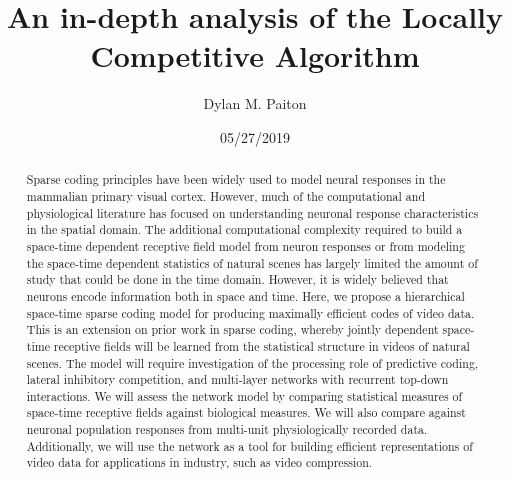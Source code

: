 \documentclass[smallextended]{svjour3}       %
\begin{document}
\title{An in-depth analysis of the Locally Competitive Algorithm
}



\author{Dylan M. Paiton}





\date{05/27/2019}

\maketitle

\begin{abstract}
Sparse coding principles have been widely used to model neural responses in the mammalian primary visual cortex. However, much of the computational and physiological literature has focused on understanding neuronal response characteristics in the spatial domain. The additional computational complexity required to build a space-time dependent receptive field model from neuron responses or from modeling the space-time dependent statistics of natural scenes has largely limited the amount of study that could be done in the time domain. However, it is widely believed that neurons encode information both in space and time. Here, we propose a hierarchical space-time sparse coding model for producing maximally efficient codes of video data. This is an extension on prior work in sparse coding, whereby jointly dependent space-time receptive fields will be learned from the statistical structure in videos of natural scenes. The model will require investigation of the processing role of predictive coding, lateral inhibitory competition, and multi-layer networks with recurrent top-down interactions. We will assess the network model by comparing statistical measures of space-time receptive fields against biological measures. We will also compare against neuronal population responses from multi-unit physiologically recorded data. Additionally, we will use the network as a tool for building efficient representations of video data for applications in industry, such as video compression.\\
\end{abstract}
\end{document}
